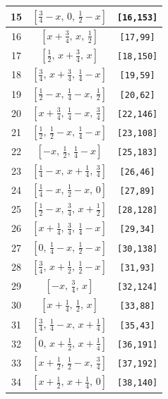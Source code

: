 \documentclass[fleqn,8pt]{jsarticle}
\begin{document}
\begin{longtable}{ccc}
15 & $\left[ \frac{3}{4} - x,\, 0,\, \frac{1}{2} - x \right]$ & {\tt [16,153]} \\ \hline
16 & $\left[ x + \frac{3}{4},\, x,\, \frac{1}{2} \right]$ & {\tt [17,99]} \\ \hline
17 & $\left[ \frac{1}{2},\, x + \frac{3}{4},\, x \right]$ & {\tt [18,150]} \\ \hline
18 & $\left[ \frac{3}{4},\, x + \frac{3}{4},\, \frac{1}{4} - x \right]$ & {\tt [19,59]} \\ \hline
19 & $\left[ \frac{1}{2} - x,\, \frac{1}{4} - x,\, \frac{1}{2} \right]$ & {\tt [20,62]} \\ \hline
20 & $\left[ x + \frac{3}{4},\, \frac{1}{4} - x,\, \frac{3}{4} \right]$ & {\tt [22,146]} \\ \hline
21 & $\left[ \frac{1}{2},\, \frac{1}{2} - x,\, \frac{1}{4} - x \right]$ & {\tt [23,108]} \\ \hline
22 & $\left[ - x,\, \frac{1}{2},\, \frac{1}{4} - x \right]$ & {\tt [25,183]} \\ \hline
23 & $\left[ \frac{1}{4} - x,\, x + \frac{1}{4},\, \frac{3}{4} \right]$ & {\tt [26,46]} \\ \hline
24 & $\left[ \frac{1}{4} - x,\, \frac{1}{2} - x,\, 0 \right]$ & {\tt [27,89]} \\ \hline
25 & $\left[ \frac{1}{2} - x,\, \frac{3}{4},\, x + \frac{1}{2} \right]$ & {\tt [28,128]} \\ \hline
26 & $\left[ x + \frac{1}{4},\, \frac{3}{4},\, \frac{1}{4} - x \right]$ & {\tt [29,34]} \\ \hline
27 & $\left[ 0,\, \frac{1}{4} - x,\, \frac{1}{2} - x \right]$ & {\tt [30,138]} \\ \hline
28 & $\left[ \frac{3}{4},\, x + \frac{1}{2},\, \frac{1}{2} - x \right]$ & {\tt [31,93]} \\ \hline
29 & $\left[ - x,\, \frac{3}{4},\, x \right]$ & {\tt [32,124]} \\ \hline
30 & $\left[ x + \frac{1}{4},\, \frac{1}{2},\, x \right]$ & {\tt [33,88]} \\ \hline
31 & $\left[ \frac{3}{4},\, \frac{1}{4} - x,\, x + \frac{1}{4} \right]$ & {\tt [35,43]} \\ \hline
32 & $\left[ 0,\, x + \frac{1}{2},\, x + \frac{1}{4} \right]$ & {\tt [36,191]} \\ \hline
33 & $\left[ x + \frac{1}{2},\, \frac{1}{2} - x,\, \frac{3}{4} \right]$ & {\tt [37,192]} \\ \hline
34 & $\left[ x + \frac{1}{2},\, x + \frac{1}{4},\, 0 \right]$ & {\tt [38,140]} \\ \hline

\end{longtable}
\end{document}
